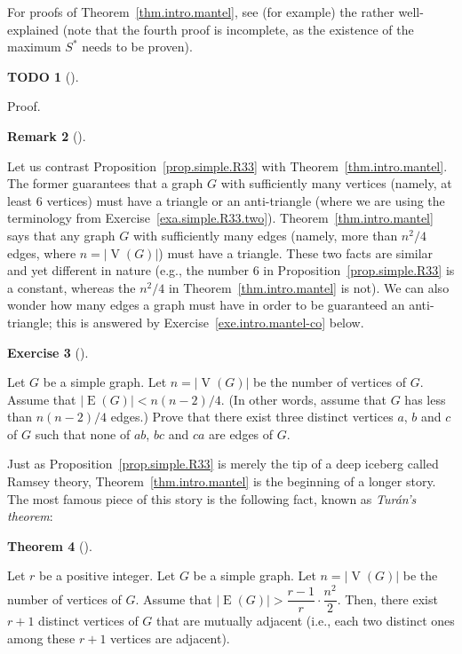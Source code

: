 \documentclass[numbers=enddot,12pt,final,onecolumn,notitlepage]{scrartcl}%
\theoremstyle{definition}
\newtheorem{theo}{Theorem}[subsection]
\newenvironment{theorem}[1][]
{\begin{theo}[#1]\begin{leftbar}}
{\end{leftbar}\end{theo}}
\newtheorem{remk}[theo]{Remark}
\newenvironment{remark}[1][]
{\begin{remk}[#1]\begin{leftbar}}
{\end{leftbar}\end{remk}}
\newtheorem{exmp}[theo]{Exercise}
\newenvironment{exercise}[1][]
{\begin{exmp}[#1]\begin{leftbar}}
{\end{leftbar}\end{exmp}}
\newtheorem{quest}[theo]{TODO}
\newenvironment{todo}[1][]
{\begin{quest}[#1]\begin{leftbar}}
{\end{leftbar}\end{quest}}
\newcommand{\abs}[1]{\left| #1 \right|}
\newcommand{\tup}[1]{\left( #1 \right)}
\newcommand{\verts}[1]{\operatorname{V}\left( #1 \right)}
\newcommand{\edges}[1]{\operatorname{E}\left( #1 \right)}
\begin{document}
For proofs of Theorem~\ref{thm.intro.mantel}, see (for example) the
rather well-explained \cite{Choo16} (note that the fourth proof is
incomplete, as the existence of the maximum $S^*$ needs to be proven).

\begin{todo}
Proof.
\end{todo}

\begin{remark}
Let us contrast Proposition~\ref{prop.simple.R33} with
Theorem~\ref{thm.intro.mantel}. The former guarantees that a graph
$G$ with sufficiently many vertices (namely, at least $6$ vertices)
must have a triangle or an anti-triangle (where we are using the
terminology from Exercise~\ref{exa.simple.R33.two}).
Theorem~\ref{thm.intro.mantel} says that any graph $G$ with
sufficiently many edges (namely, more than $n^2 / 4$ edges, where
$n = \abs{\verts{G}}$) must have a triangle. These two facts are
similar and yet different in nature (e.g., the number $6$ in
Proposition~\ref{prop.simple.R33} is a constant, whereas the $n^2 / 4$
in Theorem~\ref{thm.intro.mantel} is not). We can also wonder how many
edges a graph must have in order to be guaranteed an anti-triangle;
this is answered by Exercise~\ref{exe.intro.mantel-co} below.
\end{remark}

\begin{exercise} \label{exe.intro.mantel-co}
Let $G$ be a simple graph. Let $n = \abs{\verts{G}}$ be the number of
vertices of $G$. Assume that $\abs{\edges{G}} < n\tup{n-2} / 4$. (In
other words, assume that $G$ has less than $n\tup{n-2} / 4$ edges.)
Prove that there exist three distinct vertices $a$, $b$ and $c$ of $G$
such that none of $ab$, $bc$ and $ca$ are edges of $G$.
\end{exercise}

Just as Proposition~\ref{prop.simple.R33} is merely the tip of a deep
iceberg called Ramsey theory, Theorem~\ref{thm.intro.mantel} is the
beginning of a longer story. The most famous piece of this story is
the following fact, known as \textit{Tur\'an's theorem}:

\begin{theorem} \label{thm.intro.turan}
Let $r$ be a positive integer.
Let $G$ be a simple graph. Let $n = \abs{\verts{G}}$ be the number of
vertices of $G$. Assume that
$\abs{\edges{G}} > \dfrac{r-1}{r} \cdot \dfrac{n^2}{2}$. Then, there
exist $r + 1$ distinct vertices
of $G$ that are mutually adjacent (i.e., each two distinct ones among
these $r + 1$ vertices are adjacent).
\end{theorem}
\end{document}
